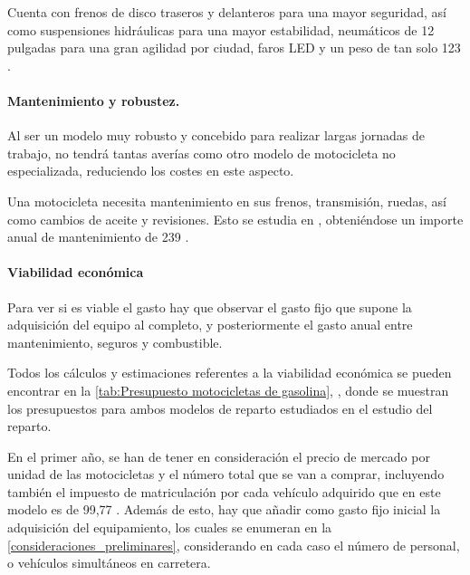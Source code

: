 Cuenta con frenos de disco traseros y delanteros para una mayor seguridad, así como suspensiones hidráulicas para una mayor estabilidad, neumáticos de 12 pulgadas para una gran agilidad por ciudad, faros LED y un peso de tan solo 123 .



\paragraph{Mantenimiento y robustez.}

Al ser un modelo muy robusto y concebido para realizar largas jornadas de trabajo, no tendrá tantas averías como otro modelo de motocicleta no especializada, reduciendo los costes en este aspecto.

Una motocicleta necesita mantenimiento en sus frenos, transmisión, ruedas, así como cambios de aceite y revisiones. Esto se estudia en , obteniéndose un importe anual de mantenimiento de 239 .
\paragraph{Viabilidad económica}
Para ver si es viable el gasto hay que observar el gasto fijo que supone la adquisición del equipo al completo, y posteriormente el gasto anual entre mantenimiento, seguros y combustible.

Todos los cálculos y estimaciones referentes a la viabilidad económica se pueden encontrar en la \autoref{tab:Presupuesto motocicletas de gasolina}, , donde se muestran los presupuestos para ambos modelos de reparto estudiados en el estudio del reparto.

En el primer año, se han de tener en consideración el precio de mercado por unidad de las motocicletas y el número total que se van a comprar, incluyendo también el impuesto de matriculación por cada vehículo adquirido que en este modelo es de 99,77 . Además de esto, hay que añadir como gasto fijo inicial la adquisición del equipamiento, los cuales se enumeran en la \autoref{consideraciones_preliminares}, considerando en cada caso el número
de personal, o vehículos simultáneos en carretera.

